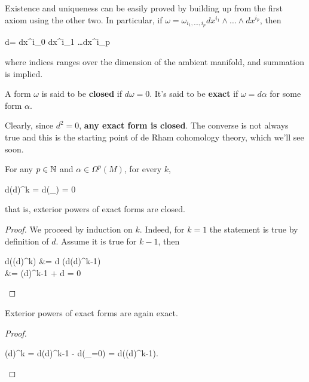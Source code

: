 Existence and uniqueness can be easily proved by building up from the first axiom using the other two. In particular, if $\omega = \omega_{i_1, \ldots, i_p} dx^{i_1} \wedge \ldots \wedge dx^{i_p}$, then
\begin{eqalign}
	d\omega =  dx^{i_0} \wedge dx^{i_1} \wedge \ldots \wedge dx^{i_p}
\end{eqalign}
where indices ranges over the dimension of the ambient manifold, and summation is implied.

\begin{definition}
	A form $\omega$ is said to be \textbf{closed} if $d\omega = 0$. It's said to be \textbf{exact} if $\omega = d\alpha$ for some form $\alpha$.
\end{definition}

Clearly, since $d^2 = 0$, \textbf{any exact form is closed}. The converse is not always true and this is the starting point of de Rham cohomology theory, which we'll see soon.

\begin{lemma}
\label{lemma:der_of_ext_power}
	For any $p \in \mathbb{N}$ and $\alpha \in \Omega^p(M)$, for every $k$,
	\begin{eqalign}
		d(d\alpha)^{\wedge k} = d(_{}) = 0
	\end{eqalign}
	that is, exterior powers of exact forms are closed.
\end{lemma}
\begin{proof}
	We proceed by induction on $k$. Indeed, for $k=1$ the statement is true by definition of $d$. Assume it is true for $k-1$, then
	\begin{eqalign}
		d\left((d\alpha\right)^{\wedge k}) &= d \left(d\alpha \wedge (d\alpha)^{\wedge k-1}\right)\\
		&=  \wedge (d\alpha)^{k-1} + d\alpha \wedge \cancel{d\left(d\alpha^{\wedge k-1}\right)} = 0
	\end{eqalign}
\end{proof}
\begin{corollary}
\label{cor:ext_power_is_exact}
	Exterior powers of exact forms are again exact.
\end{corollary}
\begin{proof}
	\begin{eqalign}
		(d\alpha)^{\wedge k} = d\alpha \wedge (d\alpha)^{\wedge k-1} - \alpha \wedge d(_{=0}) = d\left(\alpha \wedge (d\alpha)^{\wedge k-1}\right).
	\end{eqalign}
\end{proof}

